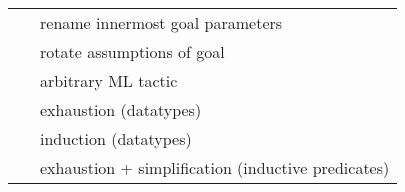 \begin{isabellebody}
\begin{isamarkuptext}
\begin{tabular}{ll}
    \hyperlink{method.rename_tac}{\mbox{\isa{rename{\isacharunderscore}tac}}}~\isa{x} & rename innermost goal parameters \\
    \hyperlink{method.rotate_tac}{\mbox{\isa{rotate{\isacharunderscore}tac}}}~\isa{n} & rotate assumptions of goal \\
    \hyperlink{method.tactic}{\mbox{\isa{tactic}}}~\isa{{\isachardoublequote}text{\isachardoublequote}} & arbitrary ML tactic \\
    \hyperlink{method.case_tac}{\mbox{\isa{case{\isacharunderscore}tac}}}~\isa{t} & exhaustion (datatypes) \\
    \hyperlink{method.induct_tac}{\mbox{\isa{induct{\isacharunderscore}tac}}}~\isa{x} & induction (datatypes) \\
    \hyperlink{method.ind_cases}{\mbox{\isa{ind{\isacharunderscore}cases}}}~\isa{t} & exhaustion + simplification (inductive predicates) \\
  \end{tabular}%
\end{isamarkuptext}%
\isamarkuptrue%
%
\isadelimtheory
%
\endisadelimtheory
%
\isatagtheory
{}\isamarkupfalse%
%
\endisatagtheory
{\isafoldtheory}%
%
\isadelimtheory
%
\endisadelimtheory
\isanewline
\end{isabellebody}%
